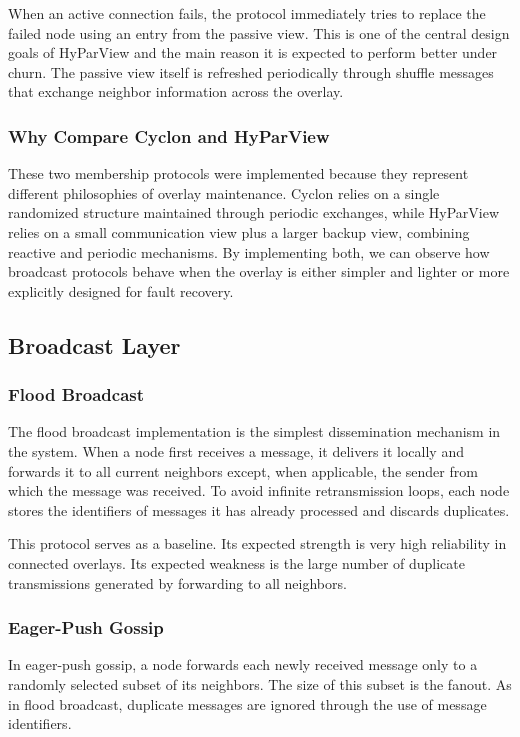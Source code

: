 \documentclass[sigconf,a4paper]{acmart}
\begin{document}
When an active connection fails, the protocol immediately tries to
replace the failed node using an entry from the passive view. This is
one of the central design goals of HyParView and the main reason it is
expected to perform better under churn. The passive view itself is
refreshed periodically through shuffle messages that exchange neighbor
information across the overlay.

\subsubsection{Why Compare Cyclon and HyParView}

These two membership protocols were implemented because they represent
different philosophies of overlay maintenance. Cyclon relies on a single
randomized structure maintained through periodic exchanges, while
HyParView relies on a small communication view plus a larger backup
view, combining reactive and periodic mechanisms. By implementing both,
we can observe how broadcast protocols behave when the overlay is either
simpler and lighter or more explicitly designed for fault recovery.

\subsection{Broadcast Layer}

\subsubsection{Flood Broadcast}

The flood broadcast implementation is the simplest dissemination
mechanism in the system. When a node first receives a message, it
delivers it locally and forwards it to all current neighbors except,
when applicable, the sender from which the message was received. To
avoid infinite retransmission loops, each node stores the identifiers of
messages it has already processed and discards duplicates.

This protocol serves as a baseline. Its expected strength is very high
reliability in connected overlays. Its expected weakness is the large
number of duplicate transmissions generated by forwarding to all
neighbors.

\subsubsection{Eager-Push Gossip}

In eager-push gossip, a node forwards each newly received message only
to a randomly selected subset of its neighbors. The size of this subset
is the fanout. As in flood broadcast, duplicate messages are ignored
through the use of message identifiers.
\end{document}
